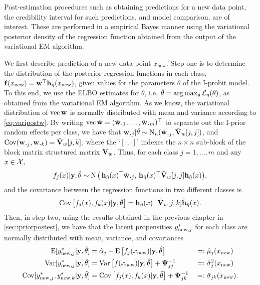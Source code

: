 Post-estimation procedures such as obtaining predictions for a new data point, the credibility interval for such predictions, and model comparison, are of interest.
These are performed in a empirical Bayes manner using the variational posterior density of the regression function obtained from the output of the variational EM algorithm.

We first describe prediction of a new data point $x_{\text{new}}$.
Step one is to determine the distribution of the posterior regression functions in each class, ${\mathbf f}(x_{\text{new}}) = {\mathbf w}^\top{\mathbf h}_\eta(x_{\text{new}})$, given values for the parameters $\theta$ of the I-probit model.
To this end, we use the ELBO estimates for $\theta$, i.e. $\hat\theta = \operatorname*{arg\,max}_\theta {\mathcal L}_q(\theta)$, as obtained from the variational EM algorithm.
As we know, the variational distribution of $\operatorname{vec}{\mathbf w}$ is normally distributed with mean and variance according to \cref{eq:varipostw}.
By writing $\vecc \tilde\bw = (\tilde \bw_{\bigcdot 1}, \dots, \tilde \bw_{\bigcdot m})^\top$ to separate out the I-prior random effects per class, we have that $\bw_{\bigcdot j}|\hat\theta \sim \N_n(\tilde \bw_{\bigcdot j}, \tilde\bV_w[j,j])$, and $\Cov(\bw_{\bigcdot j},\bw_{\bigcdot k}) = \tilde\bV_w[j,k]$, where the `$[\cdot,\cdot]$' indexes the $n\times n$ sub-block of the block matrix structured matrix ${\mathbf V}_w$.
Thus, for each class $j=1,\dots,m$ and any $x \in {\mathcal X}$,
\[
  f_j(x)|\by,\hat\theta \sim \N\big(\,
  \bh_{\hat\eta}(x)^\top \tilde\bw_{\bigcdot j}, \,
  \bh_{\hat\eta}(x)^\top\tilde\bV_w[j,j]\bh_{\hat\eta}(x)
  \big),
\]
and the covariance between the regression functions in two different classes is
\[
  \operatorname{Cov}\big[f_j(x),f_k(x)|{\mathbf y},\hat\theta \big] = 
  {\mathbf h}_{\hat\eta}(x)^\top \tilde{{\mathbf V}}_w[j,k] \tilde{{\mathbf h}}_{\hat\eta}(x).
\]
Then, in step two, using the results obtained in the previous chapter in \cref{sec:ipriorpostest}, we have that the latent propensities $y_{{\text{new}},j}^*$ for each class are normally distributed with mean, variance, and covariances
\begin{alignat*}{3}
  \operatorname{E}[y_{{\text{new}},j}^*|{\mathbf y},\hat\theta]  
  &= \hat\alpha_j + \operatorname{E} \big[ f_j(x_{\text{new}}) |{\mathbf y},\hat\theta \big] 
  &&=: \hat\mu_j(x_\text{new}) \\
  \operatorname{Var}[y_{{\text{new}},j}^*|{\mathbf y},\hat\theta] 
  &= \operatorname{Var}\big[f(x_{\text{new}})|{\mathbf y},\hat\theta \big] + {\bm\Psi}^{-1}_{jj}
  &&=: \hat\sigma_j^2(x_\text{new}) \\
  \operatorname{Cov}[y_{{\text{new}},j}^*,y_{{\text{new}},k}^*|{\mathbf y},\hat\theta] 
  &= \operatorname{Cov}\big[f_j(x),f_k(x)|{\mathbf y},\hat\theta \big] + {\bm\Psi}^{-1}_{jk}
  &&=: \hat\sigma_{jk}(x_\text{new}).
\end{alignat*}

